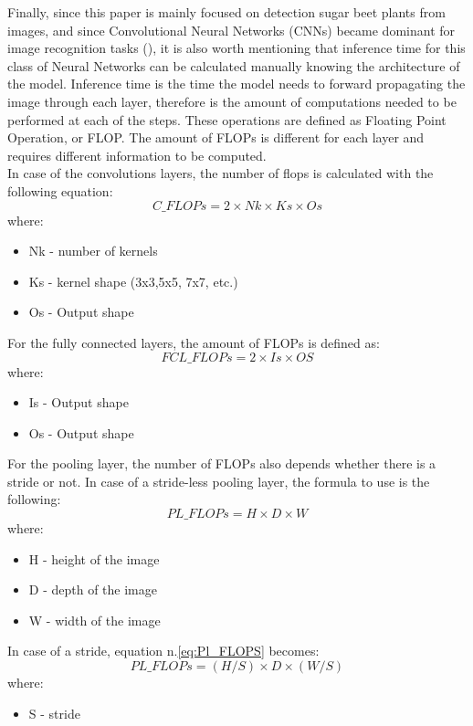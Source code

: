 Finally, since this paper is mainly focused on detection sugar beet plants from images, and since Convolutional Neural Networks (CNNs) became dominant for image recognition tasks (\cite{articleCNN}), it is also worth mentioning that inference time for this class of Neural Networks can be calculated manually knowing the architecture of the model. Inference time is the time the model needs to forward propagating the image through each layer, therefore is the amount of computations needed to be performed at each of the steps. These operations are defined as Floating Point Operation, or FLOP. The amount of FLOPs is different for each layer and requires different information to be computed. \\
In case of the convolutions layers, the number of flops is calculated with the following equation:
\begin{equation}
C\_FLOPs = 2\times Nk \times Ks \times Os
\end{equation}
where:
\begin{itemize}
\item[] Nk - number of kernels
\item[] Ks - kernel shape (3x3,5x5, 7x7, etc.)
\item[] Os - Output shape
\end{itemize}
For the fully connected layers, the amount of FLOPs is defined as:
\begin{equation}
FCL\_FLOPs = 2\times Is \times OS
\end{equation}
where:
\begin{itemize}
\item[] Is - Output shape
\item[] Os - Output shape
\end{itemize}
For the pooling layer, the number of FLOPs also depends whether there is a stride or not. In case of a stride-less pooling layer, the formula to use is the following:
\begin{equation}
PL\_FLOPs = H \times D \times W
\label{eq:Pl_FLOPS}
\end{equation}
where:
\begin{itemize}
\item[] H - height of the image
\item[] D - depth of the image
\item[] W - width of the image
\end{itemize}
In case of a stride, equation n.\ref{eq:Pl_FLOPS} becomes:
\begin{equation}
PL\_FLOPs = (H/S) \times D \times (W/S)
\end{equation}
where:
\begin{itemize}
\item[] S - stride
\end{itemize}

